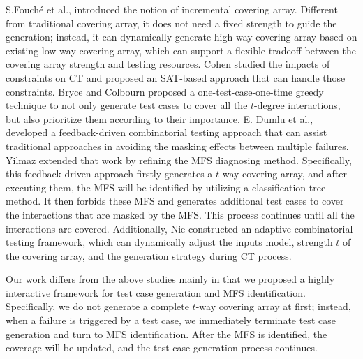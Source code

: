 \documentclass[journal,12pt,onecolumn,draftclsnofoot,]{IEEEtran}
\begin{document}
S.Fouch{\'e}  et al., \cite{fouche2009incremental} introduced the notion of incremental covering array. Different from traditional covering array, it does not need a fixed strength to guide the generation; instead, it can dynamically generate high-way covering array based on existing low-way covering array, which can support a flexible tradeoff between the covering array strength and testing resources. Cohen \cite{cohen2007exploiting,cohen2008constructing} studied the impacts of constraints on CT and proposed an SAT-based approach that can handle those constraints.  Bryce and Colbourn \cite{bryce2006prioritized} proposed a one-test-case-one-time greedy technique to not only generate test cases to cover all the $t$-degree interactions, but also prioritize them according to their importance.  E. Dumlu et al., \cite{dumlu2011feedback} developed a feedback-driven combinatorial testing approach that can assist traditional approaches in avoiding the masking effects between multiple failures. Yilmaz \cite{yilmaz2013reducing} extended that work by refining the MFS diagnosing method. Specifically, this feedback-driven approach firstly generates a $t$-way covering array, and after executing them, the MFS will be identified by utilizing a classification tree method. It then forbids these MFS and generates additional test cases to cover the interactions that are masked by the MFS. This process continues until all the interactions are covered. Additionally, Nie \cite{nie2013adaptive} constructed an adaptive combinatorial testing framework, which can dynamically adjust the inputs model, strength $t$ of the covering array, and the generation strategy during CT process.

Our work differs from the above studies mainly in that we proposed a highly interactive framework for test case generation and MFS identification. Specifically, we do not generate a complete $t$-way covering array at first; instead, when a failure is triggered by a test case, we immediately terminate test case generation and turn to MFS identification. After the MFS is identified, the coverage will be updated, and the test case generation process continues.
\end{document}
